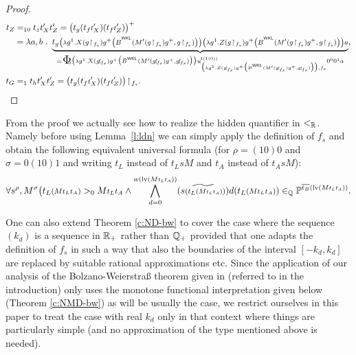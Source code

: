 \begin{proof}
\begin{align*}
t_Z&=_{10} t_zt_{X}'t_{Z}'
	  =\big(t_g(t_f\args t_X')(t_f\args t_Z')\big)^+ \\
   &=\lambda a, b\ .\ \underbrace { t_g\args{
    	\big( \args \lambda g^1 . X     		
	(g\!\restriction\!{_{f_s}})
    	g^+
    	\big(B^{^\WKL}(M'(g\!\restriction\!{_{f_s}})g^+,g\!\restriction\!{_{f_s}})\big)	 \big)
    	\big( \args \lambda g^1 . Z 
        (g\!\restriction\!{_{f_s}})
    	g^+
    	\big(B^{^\WKL}(M'(g\!\restriction\!{_{f_s}})g^+,g\!\restriction\!{_{f_s}})\big)	 \big)
    	a} }_{=\xTWf
    	{\big( \args \lambda g^1 . X 
        (g\!\restriction\!{_{f_s}}) g^+
    	\big(B^{^\WKL}(M'(g\!\restriction\!{_{f_s}})g^+,g\!\restriction\!{_{f_s}})\big)	 \big)}
		  {\big( \args \lambda g^1 . Z 
        (g\!\restriction\!{_{f_s}})
    	g^+ \big(B^{^\WKL}(M'(g\!\restriction\!{_{f_s}})g^+,g\!\restriction\!{_{f_s}})\big)
        \big)}{f_s}a} ,\\
t_G &=_1t_ht_{X}'t_{Z}' 
     =\big(t_g(t_f\args t_X')(t_f\args t_Z')\big)\!\restriction\!{_{f_s}} . 
\end{align*} 
\end{proof}


\begin{remark}
From the proof we actually see how to realize the hidden quantifier in 
$<_{\mathbb{R}}$. Namely before using Lemma~\ref{l:ldn} we can simply 
apply the definition of $f_s$ and obtain
the following equivalent universal formula (for $\rho=(10)0$ and $\sigma=0(10)1$ 
and writing ${t_L}$ instead of $t_LsM$ and ${t_A}$ instead of $t_AsM$):
\[
\forall s^{\rho}, M^{\sigma}
  \big( {t_L}\args{(M\args{{t_L}{t_A}})}>_0 M\args{{t_L}{t_A}}\wedge\ 
  \!\!\bigwedge_{d=0}^{w(\l(M\args{{t_L}{t_A}}))}
         (\widetilde{s\args{({t_L}\args{(M\args{{t_L}{t_A}})})}})d({t_L}\args{(M\args{{t_L}{t_A}})})
         \in_\QQ \PP^{\overline{t_B}(\l(M\args{t_Lt_A}))}
\text{.}
\]
\end{remark}
\begin{remark} 
One can also extend Theorem \ref{c:ND-bw} to cover the case where the 
sequence $(k_d)$ is a sequence in $\mathbb{R}_+$ rather than $\mathbb{Q}_+$ provided that 
one adapts the definition of $f_s$ in such a way that also the boundaries 
of the interval $[-k_d,k_d]$ are replaced by suitable rational 
approximations etc. Since the application of our analysis of the 
Bolzano-Weierstra\ss{} theorem given in \cite{Kohlenbach2011} (referred 
to in the introduction) only uses the monotone functional interpretation 
given below (Theorem \ref{c:NMD-bw}) as will be usually the case, 
we restrict ourselves in this paper to treat the case with 
real $k_d$ only in that context where things are particularly simple 
(and no approximation of the type mentioned above is needed). 
\end{remark}

